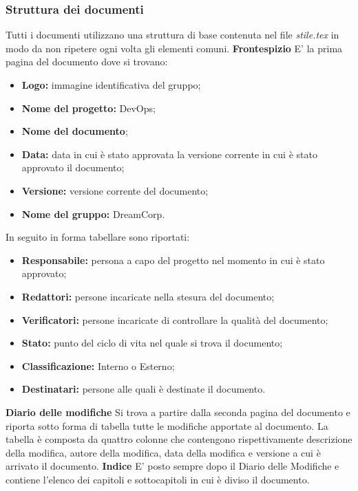 		\subsubsection{Struttura dei documenti}
			Tutti i documenti utilizzano una struttura di base contenuta nel file \textit{stile.tex} in modo da non ripetere ogni volta gli elementi comuni.
			\newline \newline \textbf{Frontespizio} E' la prima pagina del documento dove si trovano:
			\begin{itemize}
				\item \textbf{Logo:} immagine identificativa del gruppo;
				\item \textbf{Nome del progetto:} DevOps;
				\item \textbf{Nome del documento};
				\item \textbf{Data:} data in cui è stato approvata la versione corrente in cui è stato approvato il documento;
				\item \textbf{Versione:} versione corrente del documento;
				\item \textbf{Nome del gruppo:} DreamCorp.
			\end{itemize}
			In seguito in forma tabellare sono riportati:
			\begin{itemize}
				\item \textbf{Responsabile:} persona a capo del progetto nel momento in cui è stato approvato;
				\item \textbf{Redattori:} persone incaricate nella stesura del documento;
				\item \textbf{Verificatori:} persone incaricate di controllare la qualità del documento;
				\item \textbf{Stato:} punto del ciclo di vita nel quale si trova il documento;
				\item \textbf{Classificazione:} Interno o Esterno;
				\item \textbf{Destinatari:} persone alle quali è destinate il documento.
			\end{itemize}
		\textbf{Diario delle modifiche}  Si trova a partire dalla seconda pagina del documento e riporta sotto forma di tabella tutte le modifiche apportate al documento. La tabella è composta da quattro colonne che contengono rispettivamente descrizione della modifica, autore della modifica, data della modifica e versione a cui è arrivato il documento.
		\newline \newline \textbf{Indice}  E' posto sempre dopo il Diario delle Modifiche e contiene l'elenco dei capitoli e sottocapitoli in cui è diviso il documento.
